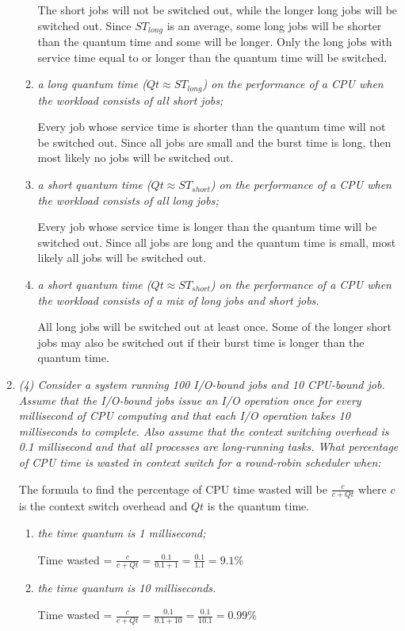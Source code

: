 \documentclass[letterpaper,11pt]{article}
\begin{document}
\begin{enumerate}
\begin{enumerate}
The short jobs will not be switched out, while the longer long jobs will be switched out.  Since $ST_{long}$ is an average, some long jobs will be shorter than the quantum time and some will be longer.  Only the long jobs with service time equal to or longer than the quantum time will be switched.
\item \emph{a long quantum time ($Qt \approx ST_{long}$) on the performance of a CPU when the workload consists of all short jobs;}

Every job whose service time is shorter than the quantum time will not be switched out.  Since all jobs are small and the burst time is long, then most likely no jobs will be switched out. 
\item \emph{a short quantum time ($Qt \approx ST_{short}$) on the performance of a CPU when the workload consists of all long jobs;}

Every job whose service time is longer than the quantum time will be switched out.  Since all jobs are long and the quantum time is small, most likely all jobs will be switched out.
\item \emph{a short quantum time ($Qt \approx ST_{short}$) on the performance of a CPU when the workload consists of a mix of long jobs and short jobs.}

All long jobs will be switched out at least once.  Some of the longer short jobs may also be switched out if their burst time is longer than the quantum time.
\end{enumerate}
\item \emph{(4) Consider a system running 100 I/O-bound jobs and 10 CPU-bound job. Assume that the I/O-bound jobs issue an I/O operation once for every millisecond of CPU computing and that each I/O operation takes 10 milliseconds to complete. Also assume that the context switching overhead is 0.1 millisecond and that all processes are long-running tasks. What percentage of CPU time is wasted in context switch for a round-robin scheduler when:}

The formula to find the percentage of CPU time wasted will be $\frac{c}{c + Qt}$ where $c$ is the context switch overhead and $Qt$ is the quantum time.
\begin{enumerate}
\item \emph{the time quantum is 1 millisecond;}

Time wasted = $\frac{c}{c + Qt} = \frac{0.1}{0.1 + 1} = \frac{0.1}{1.1} = 9.1 \% $
\item \emph{the time quantum is 10 milliseconds.}

Time wasted = $\frac{c}{c + Qt} = \frac{0.1}{0.1 + 10} = \frac{0.1}{10.1} = 0.99 \% $
\end{enumerate}
\end{enumerate}
\end{document}
